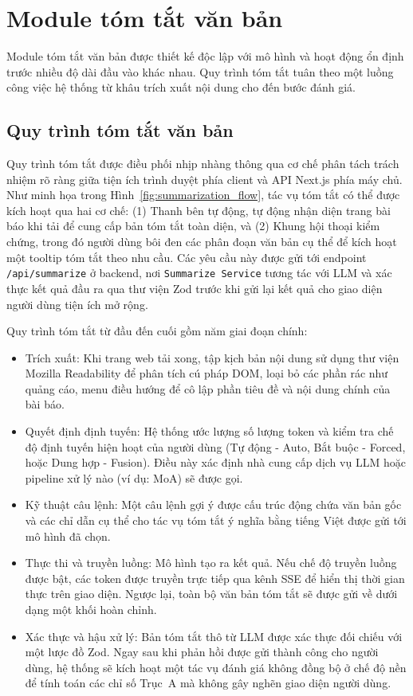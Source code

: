 \section{Module tóm tắt văn bản}

Module tóm tắt văn bản được thiết kế độc lập với mô hình và hoạt động ổn định trước nhiều độ dài đầu vào khác nhau. 
Quy trình tóm tắt tuân theo một luồng công việc hệ thống từ khâu trích xuất nội dung cho đến bước đánh giá.

\subsection{Quy trình tóm tắt văn bản}

Quy trình tóm tắt được điều phối nhịp nhàng thông qua cơ chế phân tách trách nhiệm rõ ràng 
giữa tiện ích trình duyệt phía client và API Next.js phía máy chủ. 
Như minh họa trong Hình~\ref{fig:summarization_flow}, tác vụ tóm tắt có thể được kích hoạt qua hai cơ chế: 
(1) Thanh bên tự động, tự động nhận diện trang bài báo khi tải để cung cấp bản tóm tắt toàn diện, 
và (2) Khung hội thoại kiểm chứng, trong đó người dùng bôi đen các phân đoạn văn bản cụ thể để kích hoạt một tooltip tóm tắt theo nhu cầu. 
Các yêu cầu này được gửi tới endpoint \texttt{/api/summarize} ở backend, nơi \texttt{Summarize Service} tương tác với LLM và xác thực kết quả đầu ra qua thư viện Zod trước khi gửi lại kết quả cho giao diện người dùng tiện ích mở rộng.

Quy trình tóm tắt từ đầu đến cuối gồm năm giai đoạn chính:

\begin{itemize}
    \item Trích xuất: Khi trang web tải xong, tập kịch bản nội dung sử dụng thư viện Mozilla Readability để phân tích cú pháp DOM, loại bỏ các phần rác như quảng cáo, menu điều hướng để cô lập phần tiêu đề và nội dung chính của bài báo.
    \item Quyết định định tuyến: Hệ thống ước lượng số lượng token và kiểm tra chế độ định tuyến hiện hoạt của người dùng (Tự động - Auto, Bắt buộc - Forced, hoặc Dung hợp - Fusion). Điều này xác định nhà cung cấp dịch vụ LLM hoặc pipeline xử lý nào (ví dụ: MoA) sẽ được gọi.
    \item Kỹ thuật câu lệnh: Một câu lệnh gợi ý được cấu trúc động chứa văn bản gốc và các chỉ dẫn cụ thể cho tác vụ tóm tắt ý nghĩa bằng tiếng Việt được gửi tới mô hình đã chọn.
    \item Thực thi và truyền luồng: Mô hình tạo ra kết quả. Nếu chế độ truyền luồng được bật, các token được truyền trực tiếp qua kênh SSE để hiển thị thời gian thực trên giao diện. Ngược lại, toàn bộ văn bản tóm tắt sẽ được gửi về dưới dạng một khối hoàn chỉnh.
    \item Xác thực và hậu xử lý: Bản tóm tắt thô từ LLM được xác thực đối chiếu với một lược đồ Zod. Ngay sau khi phản hồi được gửi thành công cho người dùng, hệ thống sẽ kích hoạt một tác vụ đánh giá không đồng bộ ở chế độ nền để tính toán các chỉ số Trục~A mà không gây nghẽn giao diện người dùng.
\end{itemize}

